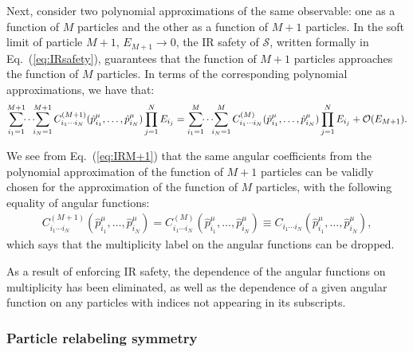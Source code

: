 \documentclass[letterpaper,11pt]{article}
\DeclareRobustCommand{\Eq}[1]{Eq.~(\ref{#1})}
\begin{document}
Next, consider two polynomial approximations of the same observable: one as a function of $M$ particles and the other as a function of $M+1$ particles.
%
In the soft limit of particle $M+1$, $E_{M+1}\to 0$, the IR safety of $\mathcal S$, written formally in \Eq{eq:IRsafety}, guarantees that the function of $M+1$ particles approaches the function of $M$ particles. In terms of the corresponding polynomial approximations, we have that:
\begin{align}\label{eq:IRM+1}
\sum_{i_1=1}^{M+1} \hspace{-.05in}\cdots \hspace{-.05in}\sum_{i_N=1}^{M+1}C^{(M+1)}_{i_1 \cdots i_N}(\hat p_{i_1}^\mu,\ldots, \hat p_{i_N}^\mu) \prod_{j=1}^N E_{i_j}=\sum_{i_1=1}^{M} \hspace{-.05in}\cdots \hspace{-.05in}\sum_{i_N=1}^{M} C^{(M)}_{i_1 \cdots i_N} (\hat p_{i_1}^\mu,\ldots, \hat p_{i_N}^\mu)\prod_{j=1}^N E_{i_j}+\mathcal O(E_{M+1}).
\end{align}

We see from \Eq{eq:IRM+1} that the same angular coefficients from the polynomial approximation of the function of $M+1$ particles can be validly chosen for the approximation of the function of $M$ particles, with the following equality of angular functions:
\begin{align}\label{eq:IRresult2}
C^{(M+1)}_{i_1 \cdots i_N} (\hat p_{i_1}^\mu,\ldots,\hat p_{i_N}^\mu)=C^{(M)}_{i_1\cdots i_N} (\hat p_{i_1}^\mu, \ldots, \hat p_{i_N}^\mu)\equiv C_{i_1\cdots i_N}(\hat p_{i_1}^\mu,\ldots,\hat p_{i_N}^\mu),
\end{align}
which says that the multiplicity label on the angular functions can be dropped.

As a result of enforcing IR safety, the dependence of the angular functions on multiplicity has been eliminated, as well as the dependence of a given angular function on any particles with indices not appearing in its subscripts. 


\subsubsection{Particle relabeling symmetry }
\label{sec:relabelsym}
\end{document}

